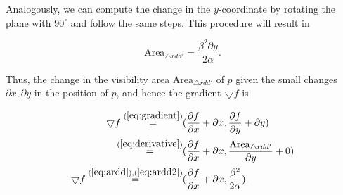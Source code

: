 Analogously, we can compute the change in the $y$-coordinate by rotating the plane with $90^\circ$ and follow the same steps. This procedure will result in

\begin{equation}
    \text{Area}_{\triangle rdd'} = \frac{\beta^2 \partial y}{2\alpha}. \label{eq:ardd2}
\end{equation}

Thus, the change in the visibility area $\text{Area}_{\triangle rdd'}$ of $p$ given the small changes $\partial x, \partial y$ in the position of $p$, and hence the gradient $\bigtriangledown f$ is 

\begin{align*}
    \bigtriangledown f \overset{(\ref{eq:gradient})}{=} &(\frac{\partial f}{\partial x} + \partial x, \frac{\partial f}{\partial y} + \partial y) \\
    \overset{(\ref{eq:derivative})}{=} &(\frac{\partial f}{\partial x} + \partial x, \frac{\text{Area}_{\triangle rdd'}}{\partial y} + 0) \\
    \bigtriangledown f \overset{(\ref{eq:ardd}), (\ref{eq:ardd2})}{=} &(\frac{\partial f}{\partial x} + \partial x, \frac{\beta^2}{2\alpha}). \\
\end{align*}


    

    


